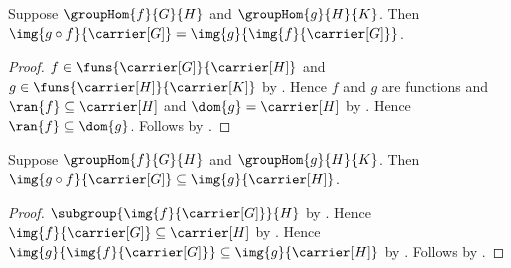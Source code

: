 \begin{proposition}\label{group_hom_composition_image}
    Suppose $\groupHom{f}{G}{H}$ and
        $\groupHom{g}{H}{K}$.
    Then $\img{g\circ f}{\carrier[G]}=
        \img{g}{\img{f}{\carrier[G]}}$.
\end{proposition}
\begin{proof}
    $f\in\funs{\carrier[G]}{\carrier[H]}$ and
        $g\in\funs{\carrier[H]}{\carrier[K]}$ by
        .
    Hence $f$ and $g$ are functions and
        $\ran{f}\subseteq\carrier[H]$ and
        $\dom{g}=\carrier[H]$ by
        .
    Hence $\ran{f}\subseteq\dom{g}$.
    Follows by .
\end{proof}

\begin{proposition}\label{group_hom_composition_image_subseteq}
    Suppose $\groupHom{f}{G}{H}$ and
        $\groupHom{g}{H}{K}$.
    Then $\img{g\circ f}{\carrier[G]}\subseteq
        \img{g}{\carrier[H]}$.
\end{proposition}
\begin{proof}
    $\subgroup{\img{f}{\carrier[G]}}{H}$ by
        .
    Hence $\img{f}{\carrier[G]}\subseteq\carrier[H]$ by
        .
    Hence $\img{g}{\img{f}{\carrier[G]}}\subseteq
        \img{g}{\carrier[H]}$ by
        .
    Follows by .
\end{proof}

